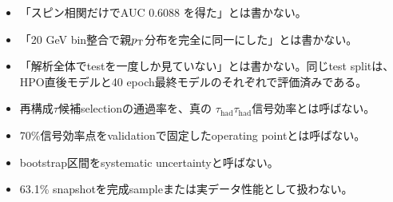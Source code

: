 \documentclass[xelatex,ja=standard,a4paper,10pt]{bxjsarticle}
\begin{document}
\begin{itemize}
  \item 「スピン相関だけでAUC \(0.6088\) を得た」とは書かない。
  \item 「20 GeV bin整合で親\(p_{\mathrm{T}}\)分布を完全に同一にした」とは書かない。
  \item 「解析全体でtestを一度しか見ていない」とは書かない。同じtest splitは、
    HPO直後モデルと40 epoch最終モデルのそれぞれで評価済みである。
  \item 再構成\(\tau\)候補selectionの通過率を、真の
    \(\tau_{\mathrm{had}}\tau_{\mathrm{had}}\)信号効率とは呼ばない。
  \item 70\%信号効率点をvalidationで固定したoperating pointとは呼ばない。
  \item bootstrap区間をsystematic uncertaintyと呼ばない。
  \item 63.1\% snapshotを完成sampleまたは実データ性能として扱わない。
\end{itemize}
\end{document}
